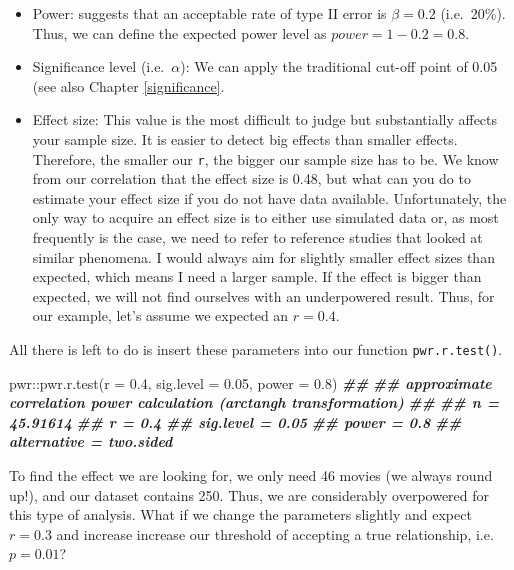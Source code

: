 \documentclass[
]{book}
\newenvironment{Shaded}{\begin{snugshade}}{\end{snugshade}}
\newcommand{\AttributeTok}[1]{\textcolor[rgb]{0.77,0.63,0.00}{#1}}
\newcommand{\DocumentationTok}[1]{\textcolor[rgb]{0.56,0.35,0.01}{\textbf{\textit{#1}}}}
\newcommand{\FloatTok}[1]{\textcolor[rgb]{0.00,0.00,0.81}{#1}}
\newcommand{\FunctionTok}[1]{\textcolor[rgb]{0.00,0.00,0.00}{#1}}
\newcommand{\NormalTok}[1]{#1}
\newcommand{\SpecialCharTok}[1]{\textcolor[rgb]{0.00,0.00,0.00}{#1}}
\begin{document}
\begin{itemize}
\item
  Power: \citet{cohen1988statistical} suggests that an acceptable rate of type II error is \(\beta = 0.2\) (i.e.~20\%). Thus, we can define the expected power level as \(power = 1 - 0.2 = 0.8\).
\item
  Significance level (i.e.~\(\alpha\)): We can apply the traditional cut-off point of 0.05 (see also Chapter \ref{significance}.
\item
  Effect size: This value is the most difficult to judge but substantially affects your sample size. It is easier to detect big effects than smaller effects. Therefore, the smaller our \texttt{r}, the bigger our sample size has to be. We know from our correlation that the effect size is 0.48, but what can you do to estimate your effect size if you do not have data available. Unfortunately, the only way to acquire an effect size is to either use simulated data or, as most frequently is the case, we need to refer to reference studies that looked at similar phenomena. I would always aim for slightly smaller effect sizes than expected, which means I need a larger sample. If the effect is bigger than expected, we will not find ourselves with an underpowered result. Thus, for our example, let's assume we expected an \(r = 0.4\).
\end{itemize}

All there is left to do is insert these parameters into our function \texttt{pwr.r.test()}.

\begin{Shaded}
\begin{Highlighting}[]
\NormalTok{pwr}\SpecialCharTok{::}\FunctionTok{pwr.r.test}\NormalTok{(}\AttributeTok{r =} \FloatTok{0.4}\NormalTok{,}
                \AttributeTok{sig.level =} \FloatTok{0.05}\NormalTok{,}
                \AttributeTok{power =} \FloatTok{0.8}\NormalTok{)}
\DocumentationTok{\#\# }
\DocumentationTok{\#\#      approximate correlation power calculation (arctangh transformation) }
\DocumentationTok{\#\# }
\DocumentationTok{\#\#               n = 45.91614}
\DocumentationTok{\#\#               r = 0.4}
\DocumentationTok{\#\#       sig.level = 0.05}
\DocumentationTok{\#\#           power = 0.8}
\DocumentationTok{\#\#     alternative = two.sided}
\end{Highlighting}
\end{Shaded}

To find the effect we are looking for, we only need 46 movies (we always round up!), and our dataset contains 250. Thus, we are considerably overpowered for this type of analysis. What if we change the parameters slightly and expect \(r = 0.3\) and increase increase our threshold of accepting a true relationship, i.e.~\(p = 0.01\)?
\end{document}
